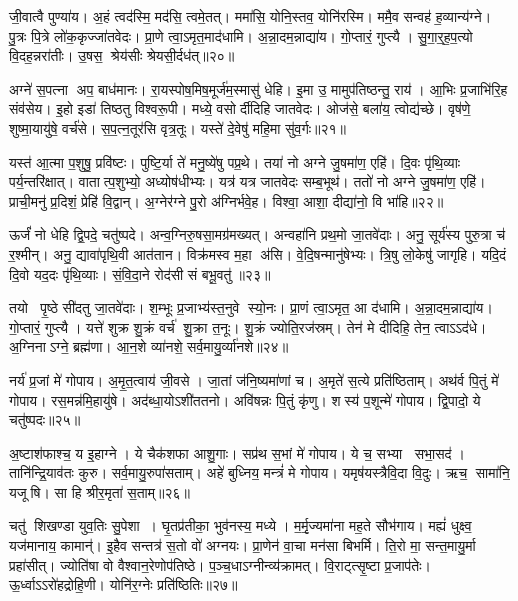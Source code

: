 जी॒वात्वै पुण्या॑य।
अ॒हं त्वद॑स्मि॒ मद॑सि॒ त्वमे॒तत्।
ममा॑सि॒ योनि॒स्तव॒ योनि॑रस्मि।
ममै॒व सन्वह॑ ह॒व्यान्य॑ग्ने।
पु॒त्रः पि॒त्रे लो॑क॒कृज्जा॑तवेदः।
प्रा॒णे त्वा॒ऽमृत॒माद॑धामि।
अ॒न्ना॒दम॒न्नाद्या॑य।
गो॒प्तारं॒ गुप्त्यै।
सु॒गा॒र्॒ह॒प॒त्यो वि॒दह॒न्नरा॑तीः।
उ॒षस॒ श्रेय॑सीः श्रेयसी॒र्दध॑त्॥२०॥

अग्ने॑ स॒पत्ना अप॒ बाध॑मानः।
रा॒यस्पोष॒मिष॒मूर्ज॑म॒स्मासु॑ धेहि।
इ॒मा उ॒ मामुप॑तिष्ठन्तु॒ राय॑।
आ॒भिः प्र॒जाभि॑रि॒ह संव॑सेय।
इ॒हो इडा॑ तिष्ठतु विश्वरू॒पी।
मध्ये॒ वसोर्दीदिहि जातवेदः।
ओज॑से॒ बला॑य॒ त्वोद्य॑च्छे।
वृष॑णे॒ शुष्मा॒यायु॑षे॒ वर्च॑से।
स॒प॒त्न॒तूर॑सि वृत्र॒तूः।
यस्ते॑ दे॒वेषु॑ महि॒मा सु॑व॒र्गः॥२१॥

यस्त॑ आ॒त्मा प॒शुषु॒ प्रवि॑ष्टः।
पुष्टि॒र्या ते॑ मनु॒ष्ये॑षु पप्र॒थे।
तया॑ नो अग्ने जु॒षमा॑ण॒ एहि॑।
दि॒वः पृ॑थि॒व्याः पर्य॒न्तरि॑क्षात्।
वातात्प॒शुभ्यो॒ अध्योष॑धीभ्यः।
यत्र॑ यत्र जातवेदः सम्ब॒भूथ॑।
ततो॑ नो अग्ने जु॒षमा॑ण॒ एहि॑।
प्राची॒मनु॑ प्र॒दिशं॒ प्रेहि॑ वि॒द्वान्।
अ॒ग्नेर॑ग्ने पु॒रो अ॑ग्निर्भवे॒ह।
विश्वा॒ आशा॒ दीद्या॑नो॒ वि भा॑हि॥२२॥

ऊर्जं॑ नो धेहि द्वि॒पदे॒ चतु॑ष्पदे।
अन्व॒ग्निरु॒षसा॒मग्र॑मख्यत्।
अन्वहा॑नि प्रथ॒मो जा॒तवे॑दाः।
अनु॒ सूर्य॑स्य पुरु॒त्रा च॑ र॒श्मीन्।
अनु॒ द्यावा॑पृथि॒वी आत॑तान।
विक्र॑मस्व म॒हा अ॑सि।
वे॒दि॒षन्मानु॑षेभ्यः।
त्रि॒षु लो॒केषु॑ जागृहि।
यदि॒दं दि॒वो यद॒दः पृ॑थि॒व्याः।
सं॒वि॒दा॒ने रोद॑सी सं बभू॒वतु॑॥२३॥

तयो पृ॒ष्ठे सी॑दतु जा॒तवे॑दाः।
श॒म्भूः प्र॒जाभ्य॑स्त॒नुवे स्यो॒नः।
प्रा॒णं त्वा॒ऽमृत॒ आ द॑धामि।
अ॒न्ना॒दम॒न्नाद्या॑य।
गो॒प्तारं॒ गुप्त्यै।
यत्ते॑ शुक्र शु॒क्रं वर्च॑ शु॒क्रा त॒नूः।
शु॒क्रं ज्योति॒रज॑स्रम्।
तेन॑ मे दीदिहि॒ तेन॒ त्वाऽऽद॑धे।
अ॒ग्निनाऽग्ने॒ ब्रह्म॑णा।
आ॒न॒शे व्या॑नशे॒ सर्व॒मायु॒र्व्या॑नशे॥२४॥

नर्य॑ प्र॒जां मे॑ गोपाय।
अ॒मृ॒त॒त्वाय॑ जी॒वसे।
जा॒तां ज॑नि॒ष्यमा॑णां च।
अ॒मृते॑ स॒त्ये प्रति॑ष्ठिताम्।
अथ॑र्व पि॒तुं मे॑ गोपाय।
रस॒मन्न॑मि॒हायु॑षे।
अद॑ब्धा॒योऽशी॑ततनो।
अवि॑षन्नः पि॒तुं कृ॑णु।
शस्य॑ प॒शून्मे॑ गोपाय।
द्वि॒पादो॒ ये चतु॑ष्पदः॥२५॥

अ॒ष्टाश॑फाश्च॒ य इ॒हाग्ने।
ये चैक॑शफा आशु॒गाः।
सप्र॑थ स॒भां मे॑ गोपाय।
ये च॒ सभ्या सभा॒सद॑।
तानि॑न्द्रि॒याव॑तः कुरु।
सर्व॒मायु॒रुपा॑सताम्।
अहे॑ बुध्निय॒ मन्त्रं॑ मे गोपाय।
यमृष॑यस्त्रैवि॒दा वि॒दुः।
ऋच॒ सामा॑नि॒ यजूषि।
सा हि श्रीर॒मृता॑ स॒ताम्॥२६॥

चतु॑ शिखण्डा युव॒तिः सु॒पेशा।
घृ॒तप्र॑तीका॒ भुव॑नस्य॒ मध्ये।
म॒र्मृ॒ज्यमा॑ना मह॒ते सौभ॑गाय।
मह्यं॑ धुक्ष्व॒ यज॑मानाय॒ कामान्॑।
इ॒हैव सन्तत्र॑ स॒तो वो॑ अग्नयः।
प्रा॒णेन॑ वा॒चा मन॑सा बिभर्मि।
ति॒रो मा॒ सन्त॒मायु॒र्मा प्रहा॑सीत्।
ज्योति॑षा वो वैश्वान॒रेणोप॑तिष्ठे।
प॒ञ्च॒धाऽग्नीन्व्य॑क्रामत्।
वि॒राट्त्सृ॒ष्टा प्र॒जाप॑तेः।
ऊ॒र्ध्वाऽऽरो॑हद्रोहि॒णी।
योनि॑र॒ग्नेः प्रति॑ष्ठितिः॥२७॥\anuvakamend[वि॒श॒न्तु॒ न॒ पु॒रू॒चीर्वि॑धेम नि॒धाय॒ यत्तेऽप्र॑दाहाय बृह॒त्यो ब्रह्म॑णा दुवस्यत वि॒श्ववा॑र इ॒ममृ॑ञ्जते पुरो॒गां प्रज॑नयि॒ष्यथो॑ जनि॒ष्यतेऽस्मै॒ मम॑ महि॒म्ना वर्च॑से॒ दध॑त्सुव॒र्गो भा॑हि सम्बभू॒वतु॒रायु॒र्व्या॑नशे॒ चतु॑ष्पदः स॒तां प्र॒जाप॑ते॒र्द्वे च॑]

